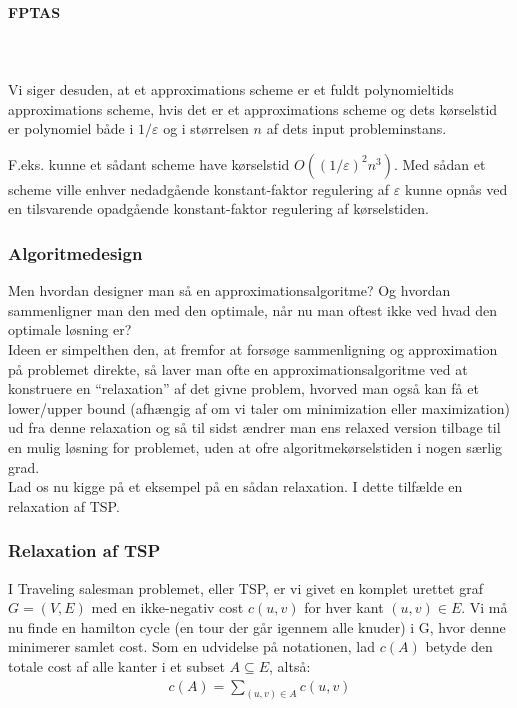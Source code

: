 \paragraph{FPTAS}
~\\
~\\

Vi siger desuden, at et approximations scheme er et fuldt polynomieltids approximations scheme, hvis det er et approximations scheme og dets kørselstid er polynomiel både i $1/\varepsilon$ og i størrelsen $n$ af dets input probleminstans.

F.eks. kunne et sådant scheme have kørselstid $O((1/\varepsilon)^2 n^3)$. Med sådan et scheme ville enhver nedadgående konstant-faktor regulering af $\varepsilon$ kunne opnås ved en tilsvarende opadgående konstant-faktor regulering af kørselstiden.

\subsubsection{Algoritmedesign}

Men hvordan designer man så en approximationsalgoritme? Og hvordan sammenligner man den med den optimale, når nu man oftest ikke ved hvad den optimale løsning er?\\

Ideen er simpelthen den, at fremfor at forsøge sammenligning og approximation på problemet direkte, så laver man ofte en approximationsalgoritme ved at konstruere en ``relaxation'' af det givne problem, hvorved man også kan få et lower/upper bound (afhængig af om vi taler om minimization eller maximization) ud fra denne relaxation og så til sidst ændrer man ens relaxed version tilbage til en mulig løsning for problemet, uden at ofre algoritmekørselstiden i nogen særlig grad.\\

Lad os nu kigge på et eksempel på en sådan relaxation. I dette tilfælde en relaxation af TSP.

\subsubsection{Relaxation af TSP}

I Traveling salesman problemet, eller TSP, er vi givet en komplet urettet graf $G=(V,E)$ med en ikke-negativ cost $c(u,v)$ for hver kant $(u,v) \in E$. Vi må nu finde en hamilton cycle (en tour der går igennem alle knuder) i G, hvor denne minimerer samlet cost. Som en udvidelse på notationen, lad $c(A)$ betyde den totale cost af alle kanter i et subset $A \subseteq E$, altså:
\begin{align*}
 c(A) = \sum_{(u,v) \in A} c(u,v)
\end{align*}

